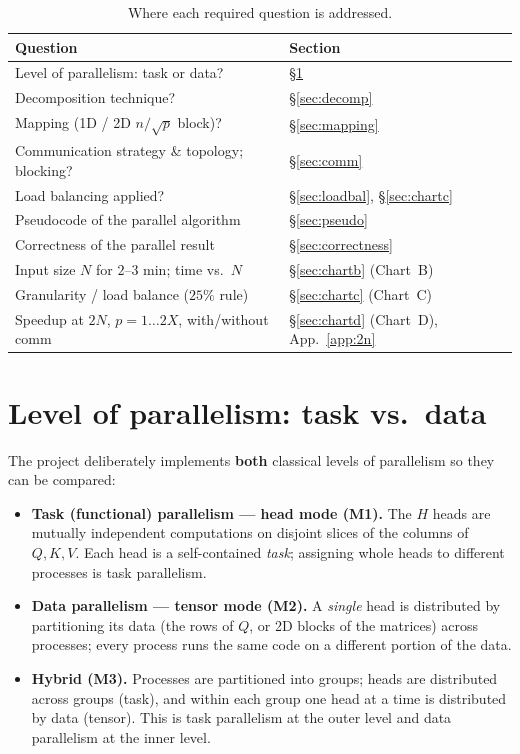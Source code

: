 \documentclass[11pt,a4paper]{article}
\begin{document}
\begin{table}[H]
\centering\small
\caption{Where each required question is addressed.}\label{tab:roadmap}
\begin{tabular}{@{}ll@{}}
\toprule
Question & Section \\
\midrule
Level of parallelism: task or data?            & \S\ref{sec:level} \\
Decomposition technique?                        & \S\ref{sec:decomp} \\
Mapping (1D / 2D $n/\sqrt{p}$ block)?            & \S\ref{sec:mapping} \\
Communication strategy \& topology; blocking?   & \S\ref{sec:comm} \\
Load balancing applied?                          & \S\ref{sec:loadbal}, \S\ref{sec:chartc} \\
Pseudocode of the parallel algorithm            & \S\ref{sec:pseudo} \\
Correctness of the parallel result              & \S\ref{sec:correctness} \\
Input size $N$ for $2$--$3$ min; time vs.\ $N$  & \S\ref{sec:chartb} (Chart~B) \\
Granularity / load balance ($25\%$ rule)        & \S\ref{sec:chartc} (Chart~C) \\
Speedup at $2N$, $p=1\ldots2X$, with/without comm & \S\ref{sec:chartd} (Chart~D), App.~\ref{app:2n} \\
\bottomrule
\end{tabular}
\end{table}

\section{Level of parallelism: task vs.\ data}
\label{sec:level}
The project deliberately implements \textbf{both} classical levels of
parallelism so they can be compared:

\begin{itemize}[leftmargin=1.4em]
\item \textbf{Task (functional) parallelism --- head mode (M1).} The $H$ heads
are mutually independent computations on disjoint slices of the columns of
$Q,K,V$. Each head is a self-contained \emph{task}; assigning whole heads to
different processes is task parallelism.
\item \textbf{Data parallelism --- tensor mode (M2).} A \emph{single} head is
distributed by partitioning its data (the rows of $Q$, or 2D blocks of the
matrices) across processes; every process runs the same code on a different
portion of the data.
\item \textbf{Hybrid (M3).} Processes are partitioned into groups; heads are
distributed across groups (task), and within each group one head at a time is
distributed by data (tensor). This is task parallelism at the outer level and
data parallelism at the inner level.
\end{itemize}
\end{document}
